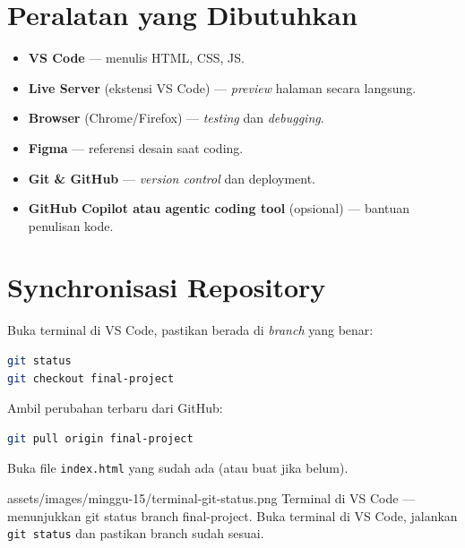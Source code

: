 \section{Peralatan yang Dibutuhkan}
\label{sec:peralatan-15}

\begin{itemize}
  \item \textbf{VS Code} --- menulis HTML, CSS, JS.
  \item \textbf{Live Server} (ekstensi VS Code) --- \emph{preview} halaman secara langsung.
  \item \textbf{Browser} (Chrome/Firefox) --- \emph{testing} dan \emph{debugging}.
  \item \textbf{Figma} --- referensi desain saat coding.
  \item \textbf{Git \& GitHub} --- \emph{version control} dan deployment.
  \item \textbf{GitHub Copilot atau agentic coding tool} (opsional) --- bantuan penulisan kode.
\end{itemize}

\section{Synchronisasi Repository}
\label{sec:sync-repo}

\begin{langkah}
  \item Buka terminal di VS Code, pastikan berada di \emph{branch} yang benar:
\begin{lstlisting}[language=bash, caption={Cek branch}]
git status
git checkout final-project
\end{lstlisting}
  \item Ambil perubahan terbaru dari GitHub:
\begin{lstlisting}[language=bash, caption={Pull perubahan terbaru}]
git pull origin final-project
\end{lstlisting}
  \item Buka file \texttt{index.html} yang sudah ada (atau buat jika belum).
\end{langkah}

\begin{tangkapanlayar}
  {assets/images/minggu-15/terminal-git-status.png}
  {Terminal di VS Code --- menunjukkan git status branch final-project.}
  {Buka terminal di VS Code, jalankan \texttt{git status} dan pastikan branch sudah sesuai.}
\end{tangkapanlayar}

